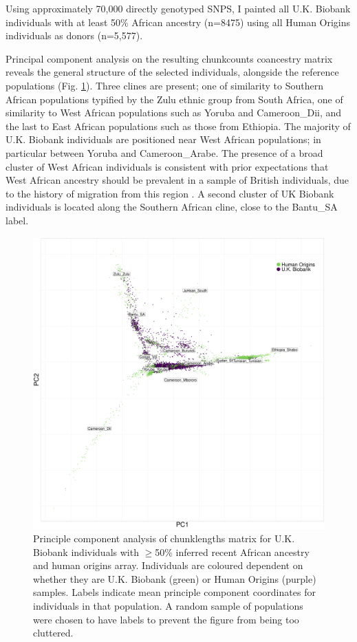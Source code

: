 Using approximately 70,000 directly genotyped SNPS, I painted all U.K. Biobank individuals with at least 50\% African ancestry (n=8475) using all Human Origins individuals as donors (n=5,577).

Principal component analysis on the resulting chunkcounts coancestry matrix reveals the general structure of the selected individuals, alongside the reference populations (Fig. \ref{fig:PCA_chunklengths_HumanOrigins_U.K.Biobank}). Three clines are present; one of similarity to Southern African populations typified by the Zulu ethnic group from South Africa, one of similarity to West African populations such as Yoruba and Cameroon\_Dii, and the last to East African populations such as those from Ethiopia. The majority of U.K. Biobank individuals are positioned near West African populations; in particular between Yoruba and Cameroon\_Arabe. The presence of a broad cluster of West African individuals is consistent with prior expectations that West African ancestry should be prevalent in a sample of British individuals, due to the history of migration from this region \cite{banton1953recent}. A second cluster of UK Biobank individuals is located along the Southern African cline, close to the Bantu\_SA label. 

\begin{figure}[htp]
    \centering
    \includegraphics[width=1.0\textwidth]{../images/chapter3/ChromoPainter_PCA_UKB_HO.pdf}
    \caption{Principle component analysis of chunklengths matrix for U.K. Biobank individuals with $\geq$50\% inferred recent African ancestry and human origins array. Individuals are coloured dependent on whether they are U.K. Biobank (green) or Human Origins (purple) samples. Labels indicate mean principle component coordinates for individuals in that population. A random sample of populations were chosen to have labels to prevent the figure from being too cluttered.}
    \label{fig:PCA_chunklengths_HumanOrigins_U.K.Biobank}
\end{figure}

